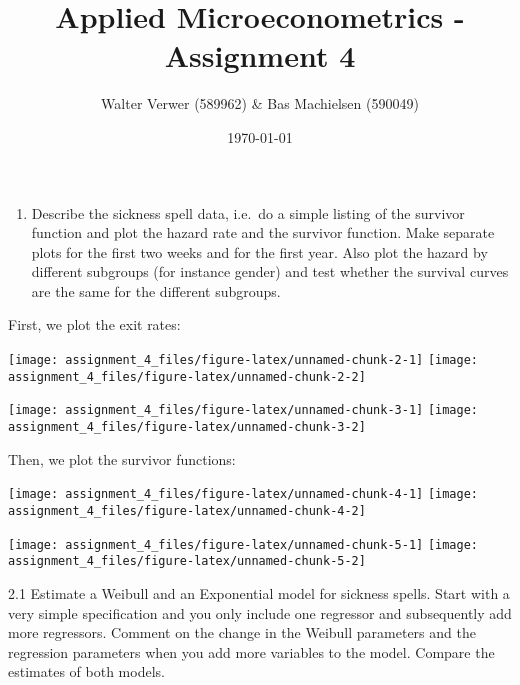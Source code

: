 \documentclass[
]{article}
\title{Applied Microeconometrics - Assignment 4}
\author{Walter Verwer (589962) \& Bas Machielsen (590049)}
\date{\today}
\providecommand{\tightlist}{%
  \setlength{\itemsep}{0pt}\setlength{\parskip}{0pt}}
\begin{document}
\maketitle

\begin{enumerate}
\def\labelenumi{\arabic{enumi}.}
\tightlist
\item
  Describe the sickness spell data, i.e.~do a simple listing of the
  survivor function and plot the hazard rate and the survivor function.
  Make separate plots for the first two weeks and for the first year.
  Also plot the hazard by different subgroups (for instance gender) and
  test whether the survival curves are the same for the different
  subgroups.
\end{enumerate}

First, we plot the exit rates:

\texttt{[image: assignment\_4\_files/figure-latex/unnamed-chunk-2-1]}
\texttt{[image: assignment\_4\_files/figure-latex/unnamed-chunk-2-2]}

\texttt{[image: assignment\_4\_files/figure-latex/unnamed-chunk-3-1]}
\texttt{[image: assignment\_4\_files/figure-latex/unnamed-chunk-3-2]}

Then, we plot the survivor functions:

\texttt{[image: assignment\_4\_files/figure-latex/unnamed-chunk-4-1]}
\texttt{[image: assignment\_4\_files/figure-latex/unnamed-chunk-4-2]}

\texttt{[image: assignment\_4\_files/figure-latex/unnamed-chunk-5-1]}
\texttt{[image: assignment\_4\_files/figure-latex/unnamed-chunk-5-2]}

\clearpage

2.1 Estimate a Weibull and an Exponential model for sickness spells.
Start with a very simple specification and you only include one
regressor and subsequently add more regressors. Comment on the change in
the Weibull parameters and the regression parameters when you add more
variables to the model. Compare the estimates of both models.
\end{document}
